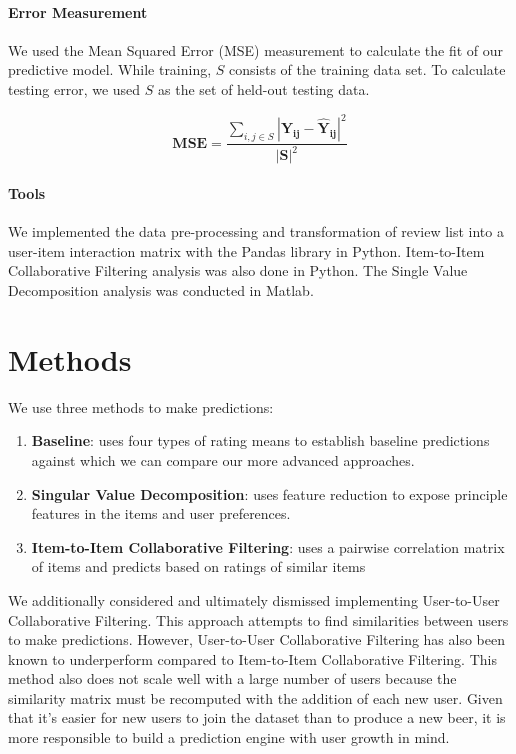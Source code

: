\documentclass[12pt]{article}
\begin{document}
\paragraph{Error Measurement}
We used the Mean Squared Error (MSE) measurement to calculate the fit of our predictive model. While training, $S$ consists of the training data set. To calculate testing error, we used $S$ as the set of held-out testing data.

$$ \mathbf{MSE} = \frac{\sum\limits_{i,j \in S} {\mathbf{|Y_{ij} - \hat{Y}_{ij}|}}^2}{{\mathbf{|S|}}^2} $$

\paragraph{Tools}
We implemented the data pre-processing and transformation of review list into a user-item interaction matrix with the Pandas library in Python. Item-to-Item Collaborative Filtering analysis was also done in Python. The Single Value Decomposition analysis was conducted in Matlab.

\section{Methods}
We use three methods to make predictions:

\begin{enumerate}
  \item \textbf{Baseline}: uses four types of rating means to establish baseline predictions against which we can compare our more advanced approaches.
  \item \textbf{Singular Value Decomposition}: uses feature reduction to expose principle features in the items and user preferences.
  \item \textbf{Item-to-Item Collaborative Filtering}: uses a pairwise correlation matrix of items and predicts based on ratings of similar items
\end{enumerate}

We additionally considered and ultimately dismissed implementing User-to-User Collaborative Filtering. This approach attempts to find similarities between users to make predictions. However, User-to-User Collaborative Filtering has also been known to underperform compared to Item-to-Item Collaborative Filtering.\textsuperscript{\cite{sarwar}} This method also does not scale well with a large number of users because the similarity matrix must be recomputed with the addition of each new user. Given that it's easier for new users to join the dataset than to produce a new beer, it is more responsible to build a prediction engine with user growth in mind.\textsuperscript{\cite{linden}}
\end{document}
